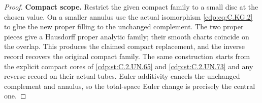 \begin{proof}
\par\medskip\noindent\textbf{Compact scope.}
Restrict the given compact family
to a small disc at the chosen
value. On a smaller annulus use
the actual isomorphism \eqref{cdp:eq:C.KG.2}
to glue the new proper filling
to the unchanged complement.
The two proper pieces give a
Hausdorff proper analytic family;
their smooth charts coincide on
the overlap. This produces the
claimed compact replacement,
and the inverse record recovers
the original compact family.
The same construction starts
from the explicit compact cores
of \ref{cdp:st:C.2.UN.65} and \ref{cdp:st:C.2.UN.73} and any reverse
record on their actual tubes.
Euler additivity cancels the
unchanged complement and annulus,
so the total-space Euler change
is precisely the central one.
\end{proof}


